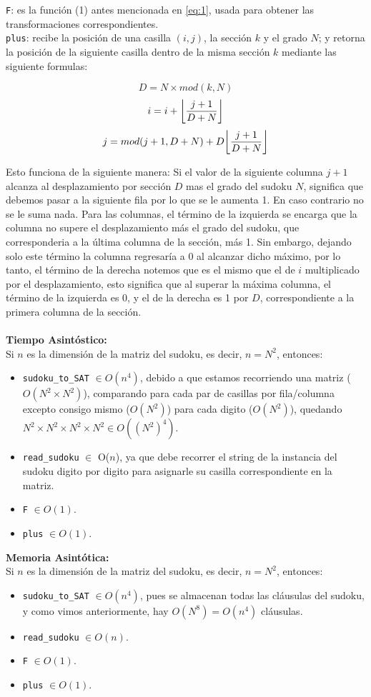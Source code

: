 \documentclass[letterpaper,12pt]{article}
\DeclarePairedDelimiter\floor{\lfloor}{\rfloor}
\begin{document}
\texttt{F}: es la función (1) antes mencionada en \ref{eq:1}, usada para obtener las transformaciones correspondientes.\\

\texttt{plus}: recibe la posición de una casilla $(i,j)$, la secci\'on $k$ y el grado $N$; y retorna la posición de la siguiente casilla dentro de la misma sección $k$ mediante las siguiente formulas:

	$$ D = N \times mod(k, N) $$
   	$$i = i + \floor*{\frac{j+1}{D+N}}$$
   	$$j = mod(j+1,D+N) + D \floor*{\frac{j+1}{D+N}}$$

Esto funciona de la siguiente manera: Si el valor de la siguiente columna $j+1$ alcanza al desplazamiento por sección $D$ mas el grado del sudoku $N$, significa que debemos pasar a la siguiente fila por lo que se le aumenta 1. En caso contrario no se le suma nada. Para las columnas, el término de la izquierda se encarga que la columna no supere el desplazamiento más el grado del sudoku, que corresponderia a la última columna de la sección, más 1. Sin embargo, dejando solo este término la columna regresaría a 0 al alcanzar dicho máximo, por lo tanto, el término de la derecha notemos que es el mismo que el de $i$ multiplicado por el desplazamiento, esto significa que al superar la máxima columna, el término de la izquierda es 0, y el de la derecha es 1 por $D$, correspondiente a la primera columna de la sección.\\ \\


\textbf{Tiempo Asintóstico:}\\
Si $n$ es la dimensi\'on de la matriz del sudoku, es decir, $n = N^2$, entonces:
\begin{itemize}
	\item \texttt{sudoku\_to\_SAT} $\in O(n^4)$, debido a que estamos recorriendo una matriz ($O(N^2 \times N^2)$), comparando para cada par de casillas por fila/columna excepto consigo mismo ($O(N^2)$) para cada digito ($O(N^2)$), quedando $N^2 \times N^2 \times N^2 \times N^2 \in O((N^2)^4)$.
	\item \texttt{read\_sudoku} $\in$ O($n$), ya que debe recorrer el string de la instancia del sudoku digito por digito para asignarle su casilla correspondiente en la matriz.
	\item \texttt{F} $\in O(1)$.
	\item \texttt{plus} $\in O(1)$.\\
\end{itemize} 


\textbf{Memoria Asintótica:}\\ 
Si $n$ es la dimensi\'on de la matriz del sudoku, es decir, $n = N^2$, entonces:
\begin{itemize}
	\item \texttt{sudoku\_to\_SAT} $\in O(n^4)$, pues se almacenan todas las cl\'ausulas del sudoku, y como vimos anteriormente, hay $O(N^8) = O(n^4)$ cl\'ausulas.
	\item \texttt{read\_sudoku} $\in O(n)$.
	\item \texttt{F} $\in O(1)$.
	\item \texttt{plus} $\in O(1)$.
\end{itemize}
\end{document}

